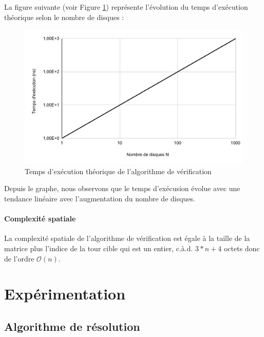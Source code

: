La figure suivante (voir Figure \ref{fig:temps_exec_th_algo_verification}) représente l'évolution du temps d'exécution théorique selon le nombre de disques :

\begin{figure}[H]
    \centering
        \includegraphics[scale=0.6]{./ressources/temps_execution_th_algo_verification.pdf}
        \caption{Temps d'exécution théorique de l'algorithme de vérification}
    \label{fig:temps_exec_th_algo_verification}
\end{figure} 

Depuis le graphe, nous observons que le temps d'exécusion évolue avec une tendance linéaire avec l'augmentation du nombre de disques.

\paragraph{Complexité spatiale}
La complexité spatiale de l'algorithme de vérification est égale à la taille de la matrice plus l'indice de la tour cible qui est un entier, c.à.d. $3 * n + 4$ octets donc de l'ordre $\mathcal{O}(n)$.


\section{Expérimentation}

\subsection{Algorithme de résolution}

